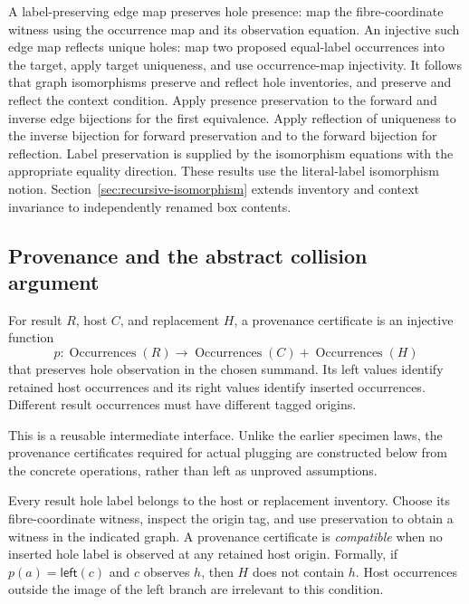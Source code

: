 A label-preserving edge map preserves hole presence: map the fibre-coordinate
witness using the occurrence map and its observation equation. An injective such
edge map reflects unique holes: map two proposed equal-label occurrences into
the target, apply target uniqueness, and use occurrence-map injectivity.
It follows that graph isomorphisms preserve and reflect hole inventories, and
preserve and reflect the context condition. Apply presence preservation to the
forward and inverse edge bijections for the first equivalence. Apply reflection
of uniqueness to the inverse bijection for forward preservation and to the
forward bijection for reflection. Label preservation is supplied by the
isomorphism equations with the appropriate equality direction.
These results use the literal-label isomorphism notion.
Section~\ref{sec:recursive-isomorphism} extends inventory and context invariance
to independently renamed box contents.

\subsection{Provenance and the abstract collision argument}
\begin{definition}\label{term:provenance}
For result $R$, host $C$, and replacement $H$, a provenance certificate is an
injective function
\[
 p:\operatorname{Occurrences}(R)\longrightarrow
 \operatorname{Occurrences}(C)+\operatorname{Occurrences}(H)
\]
that preserves hole observation in the chosen summand. Its left values identify
retained host occurrences and its right values identify inserted occurrences.
Different result occurrences must have different tagged origins.
\end{definition}
This is a reusable intermediate interface. Unlike the earlier specimen laws,
the provenance certificates required for actual plugging are constructed below
from the concrete operations, rather than left as unproved assumptions.

Every result hole label belongs to the host or replacement inventory. Choose its
fibre-coordinate witness, inspect the origin tag, and use preservation to obtain
a witness in the indicated graph.
A provenance certificate is \emph{compatible} when no inserted hole label is
observed at any retained host origin. Formally, if $p(a)=\mathsf{left}(c)$ and
$c$ observes $h$, then $H$ does not contain $h$. Host occurrences outside the
image of the left branch are irrelevant to this condition.

